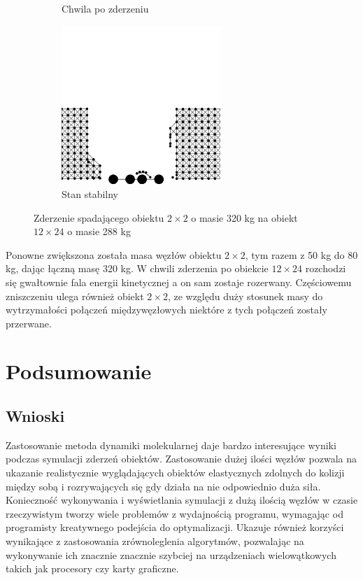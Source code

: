 \documentclass[12pt, letterpaper]{report}
\begin{document}
\begin{figure}[h]
\begin{subfigure}{0.5\textwidth}
            \caption{Chwila po zderzeniu}
        \end{subfigure}
        \begin{subfigure}{0.5\textwidth}
            \centering
            \includegraphics[width=6cm, height=6cm]{collision_2x2_24x12_mass80_4}
            \caption{Stan stabilny}
        \end{subfigure}
        
        \caption{Zderzenie spadającego obiektu $2 \times 2$ o masie 320 kg na obiekt $12 \times 24$ o masie 288 kg}
    \end{figure}

    Ponowne zwiększona została masa węzłów obiektu $2 \times 2$, tym razem z 50 kg do 80 kg, dając łączną masę 320 kg.
    W chwili zderzenia po obiekcie $12 \times 24$ rozchodzi się gwałtownie fala energii kinetycznej a on sam zostaje 
    rozerwany. Częściowemu zniszczeniu ulega również obiekt $2 \times 2$, ze względu duży stosunek masy do wytrzymałości
    połączeń międzywęzłowych niektóre z tych połączeń zostały przerwane.

\chapter{Podsumowanie}
    \section{Wnioski}
    Zastosowanie metoda dynamiki molekularnej daje bardzo interesujące 
    wyniki podczas symulacji zderzeń obiektów. Zastosowanie dużej ilości węzłów pozwala na 
    ukazanie realistycznie wyglądających obiektów elastycznych zdolnych do kolizji między sobą 
    i rozrywających się gdy działa na nie odpowiednio duża siła. \\
    
    Konieczność wykonywania i wyświetlania symulacji z dużą ilością węzłów w czasie 
    rzeczywistym tworzy wiele problemów z wydajnością programu, wymagając
    od programisty kreatywnego podejścia do optymalizacji. Ukazuje również korzyści wynikające z 
    zastosowania zrównoleglenia algorytmów, pozwalając na wykonywanie ich znacznie znacznie szybciej na 
    urządzeniach wielowątkowych takich jak procesory czy karty graficzne.
\end{document}

